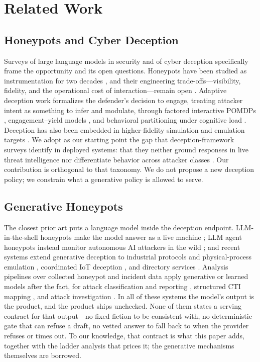\section{Related Work}
\label{sec:related}

\subsection{Honeypots and Cyber Deception}

Surveys of large language models in security \cite{wang2024} and of cyber
deception specifically \cite{lopez2024} frame the opportunity and its open
questions. Honeypots have been studied as instrumentation for two decades
\cite{spitzner2002}, and their engineering trade-offs---visibility,
fidelity, and the operational cost of interaction---remain open
\cite{sokol2017}. Adaptive deception work formalizes the
defender's decision to engage, treating attacker intent as something to
infer and modulate, through factored interactive POMDPs
\cite{shinde2020}, engagement--yield models
\cite{bera2024}, and behavioral partitioning under cognitive load
\cite{liska2024}. Deception has also been embedded in higher-fidelity
simulation and emulation targets \cite{kouremetis2024}. We adopt as our
starting point the gap that deception-framework surveys identify in deployed
systems: that they neither ground responses in live threat intelligence
nor differentiate behavior across attacker classes \cite{lopez2024}. Our
contribution is orthogonal to that taxonomy. We do not propose a new
deception policy; we constrain what a generative policy is allowed to serve.

\subsection{Generative Honeypots}

The closest prior art puts a language model inside the deception endpoint.
LLM-in-the-shell honeypots make the model answer as a live machine
\cite{valeros2024}; LLM agent honeypots instead monitor autonomous AI
attackers in the wild \cite{reworr2024}; and recent systems extend
generative deception to industrial protocols and physical-process emulation
\cite{vasilatos2025llmpot}, coordinated IoT deception
\cite{guan2025cpds}, and directory services
\cite{jimenez2025}. Analysis pipelines over collected honeypot and
incident data apply generative or learned models after the fact, for attack
classification and reporting \cite{lanka2024,simoni2024,blefari2025},
structured CTI mapping \cite{orbinato2022}, and attack investigation
\cite{alsaheel2021}. In all of these systems the model's output is the product, and the
product ships unchecked. None of them states a serving contract for that
output---no fixed fiction to be consistent with, no deterministic gate
that can refuse a draft, no vetted answer to fall back to when the
provider refuses or times out. To our knowledge, that contract is what
this paper adds, together with the ladder analysis that prices it; the
generative mechanisms themselves are borrowed.

